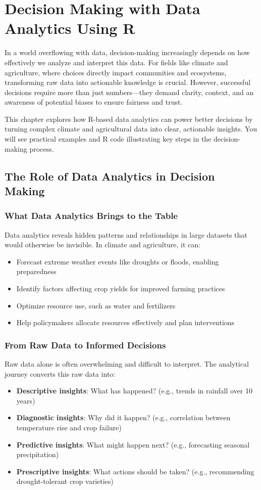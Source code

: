 \chapter{Decision Making with Data Analytics Using R}

In a world overflowing with data, decision-making increasingly depends on how effectively we analyze and interpret this data. For fields like climate and agriculture, where choices directly impact communities and ecosystems, transforming raw data into actionable knowledge is crucial. However, successful decisions require more than just numbers—they demand clarity, context, and an awareness of potential biases to ensure fairness and trust.

This chapter explores how R-based data analytics can power better decisions by turning complex climate and agricultural data into clear, actionable insights. You will see practical examples and R code illustrating key steps in the decision-making process.

\section{The Role of Data Analytics in Decision Making}

\subsection*{What Data Analytics Brings to the Table}
Data analytics reveals hidden patterns and relationships in large datasets that would otherwise be invisible. In climate and agriculture, it can:
\begin{itemize}
    \item Forecast extreme weather events like droughts or floods, enabling preparedness
    \item Identify factors affecting crop yields for improved farming practices
    \item Optimize resource use, such as water and fertilizers
    \item Help policymakers allocate resources effectively and plan interventions
\end{itemize}

\subsection*{From Raw Data to Informed Decisions}
Raw data alone is often overwhelming and difficult to interpret. The analytical journey converts this raw data into:
\begin{itemize}
    \item \textbf{Descriptive insights}: What has happened? (e.g., trends in rainfall over 10 years)
    \item \textbf{Diagnostic insights}: Why did it happen? (e.g., correlation between temperature rise and crop failure)
    \item \textbf{Predictive insights}: What might happen next? (e.g., forecasting seasonal precipitation)
    \item \textbf{Prescriptive insights}: What actions should be taken? (e.g., recommending drought-tolerant crop varieties)
\end{itemize}


